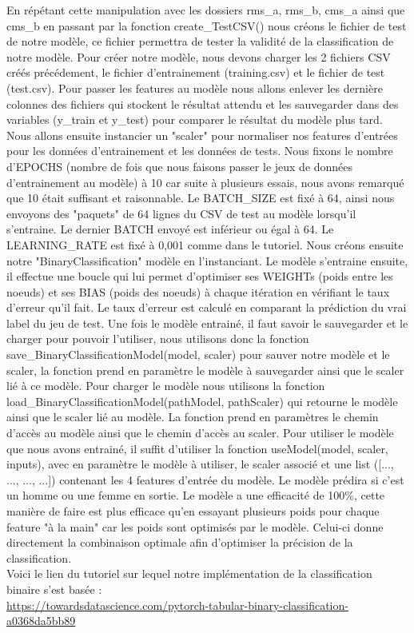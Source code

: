 \documentclass[a4paper,12pt]{report}	%
\begin{document}
En répétant cette manipulation avec les dossiers rms\_a, rms\_b, cms\_a ainsi que cms\_b en passant par la fonction create\_TestCSV() nous créons le fichier de test de notre modèle, ce fichier permettra de tester la validité de la classification de notre modèle. Pour créer notre modèle, nous devons charger les 2 fichiers CSV créés précédement, le fichier d'entrainement (training.csv) et le fichier de test (test.csv). Pour passer les features au modèle nous allons enlever les dernière colonnes des fichiers qui stockent le résultat attendu et les sauvegarder dans des variables (y\_train et y\_test) pour comparer le résultat du modèle plus tard.
Nous allons ensuite instancier un "scaler" pour normaliser nos features d'entrées pour les données d'entrainement et les données de tests. Nous fixons le nombre d'EPOCHS (nombre de fois que nous faisons passer le jeux de données d'entrainement au modèle) à 10 car suite à plusieurs essais, nous avons remarqué que 10 était suffisant et raisonnable. Le BATCH\_SIZE est fixé à 64, ainsi nous envoyons des "paquets" de 64 lignes du CSV de test au modèle lorsqu'il s'entraine. Le dernier BATCH envoyé est inférieur ou égal à 64.
Le LEARNING\_RATE est fixé à 0,001 comme dans le tutoriel. Nous créons ensuite notre "BinaryClassification" modèle en l'instanciant. Le modèle s'entraine ensuite, il effectue une boucle qui lui permet d'optimiser ses WEIGHTs (poids entre les noeuds) et ses BIAS (poids des noeuds) à chaque itération en vérifiant le taux d'erreur qu'il fait. Le taux d'erreur est calculé en comparant la prédiction du vrai label du jeu de test. Une fois le modèle entrainé, il faut savoir le sauvegarder et le charger pour pouvoir l'utiliser, nous utilisons donc la fonction save\_BinaryClassificationModel(model, scaler) pour sauver notre modèle et le scaler, la fonction prend en paramètre le modèle à sauvegarder ainsi que le scaler lié à ce modèle. Pour charger le modèle nous utilisons la fonction load\_BinaryClassificationModel(pathModel, pathScaler) qui retourne le modèle ainsi que le scaler lié au modèle. La fonction prend en paramètres le chemin d'accès au modèle ainsi que le chemin d'accès au scaler.
Pour utiliser le modèle que nous avons entrainé, il suffit d'utiliser la fonction useModel(model, scaler, inputs), avec en paramètre le modèle à utiliser, le scaler associé et une list ([..., ..., ..., ...]) contenant les 4 features d'entrée du modèle. Le modèle prédira si c'est un homme ou une femme en sortie. Le modèle a une efficacité de 100\%, cette manière de faire est plus efficace qu'en essayant plusieurs poids pour chaque feature "à la main" car les poids sont optimisés par le modèle. Celui-ci donne directement la combinaison optimale afin d'optimiser la précision de la classification.\\
Voici le lien du tutoriel sur lequel notre implémentation de la classification binaire s'est basée : \\
\noindent
\url{https://towardsdatascience.com/pytorch-tabular-binary-classification-a0368da5bb89}
\end{document}

